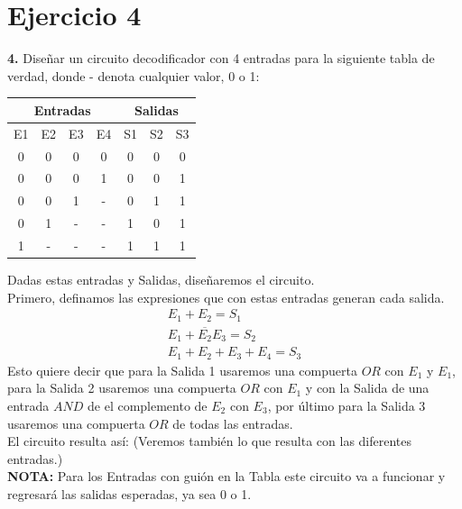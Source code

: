 \chapter*{Ejercicio 4}

\textbf{4.}  Diseñar un circuito decodificador con 4 entradas para la siguiente tabla de verdad, donde - denota cualquier valor, 0 o 1:

\begin{center}
        \begin{tabular}{|c c c c|c c c|}
        \hline
        \multicolumn{4}{|c|}{Entradas} &
        \multicolumn{3}{|c|}{Salidas} \\ \hline
        E1 & E2 & E3 & E4 & S1 & S2 & S3 \\ \hline
        0 & 0 & 0 & 0 & 0 & 0 & 0 \\ \hline
        0 & 0 & 0 & 1 & 0 & 0 & 1 \\ \hline
        0 & 0 & 1 & - & 0 & 1 & 1 \\ \hline
        0 & 1 & - & - & 1 & 0 & 1 \\ \hline
        1 & - & - & - & 1 & 1 & 1 \\ \hline
        \end{tabular}
        \label{tab:coches}
\end{center}

Dadas estas entradas y Salidas, diseñaremos el circuito. \\
Primero, definamos las expresiones que con estas entradas generan cada salida.
\begin{align*}
E_{1}+E_{2}=S_{1} \\
E_{1} + \overline{E_{2}}E_{3} = S_{2} \\
E_{1} + E_{2} + E_{3} +E_{4} = S_{3} 
\end{align*}
Esto quiere decir que para la Salida 1 usaremos una compuerta $OR$ con $E_{1}$ y $E_{1}$, para la Salida 2 usaremos una compuerta $OR$ con $E_{1}$ y con la Salida de una entrada $AND$ de el complemento de $E_{2}$ con $E_{3}$, por último para la Salida 3 usaremos una compuerta $OR$ de todas las entradas. \\
El circuito resulta así: (Veremos también lo que resulta con las diferentes entradas.) \\
\textbf{NOTA:} Para los Entradas con guión en la Tabla este circuito va a funcionar y regresará las salidas esperadas, ya sea 0 o 1.

